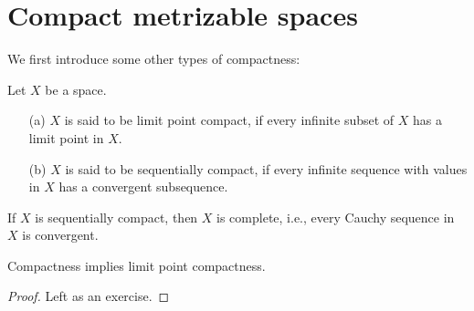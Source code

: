 \section{Compact metrizable spaces}

We first introduce some other types of compactness:
\begin{defi}
    Let $X$ be a space.
    \begin{enumerate}
        \item[(a)] $X$ is said to be limit point compact, if every infinite subset of $X$ has a limit point in $X$.
        \item[(b)] $X$ is said to be sequentially compact, if every infinite sequence with values in $X$ has a convergent subsequence.
    \end{enumerate}
\end{defi}
\begin{rmk}
    If $X$ is sequentially compact, then $X$ is complete, i.e., every Cauchy sequence in $X$ is convergent.
\end{rmk}

\begin{prop}
    Compactness implies limit point compactness.
\end{prop}
\begin{proof}
    \color{brown}Left as an exercise.\color{black}
\end{proof}

